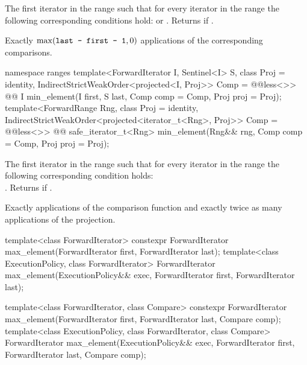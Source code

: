 \begin{itemdescr}
\pnum
\returns
The first iterator
in the range
such that for every iterator
in the range
the following corresponding conditions hold:
or
.
Returns
if
.

\pnum
\complexity
Exactly
$\max(\texttt{last - first - 1}, 0)$
applications of the corresponding comparisons.
\end{itemdescr}

\begin{addedblock}
%
\begin{itemdecl}
namespace ranges {
  template<ForwardIterator I, Sentinel<I> S, class Proj = identity,
      IndirectStrictWeakOrder<projected<I, Proj>> Comp = @@less<>>
    @@ I min_element(I first, S last, Comp comp = Comp{}, Proj proj = Proj{});
  template<ForwardRange Rng, class Proj = identity,
      IndirectStrictWeakOrder<projected<iterator_t<Rng>, Proj>> Comp = @@less<>>
    @@ safe_iterator_t<Rng>
      min_element(Rng&& rng, Comp comp = Comp{}, Proj proj = Proj{});
}
\end{itemdecl}

\begin{itemdescr}
\pnum
\returns
The first iterator
in the range
such that for every iterator
in the range
the following corresponding condition holds: \\
.
Returns
if
.

\pnum
\complexity
Exactly
applications of the comparison function and
exactly twice as many applications of the projection.
\end{itemdescr}
\end{addedblock}

%
\begin{itemdecl}
template<class ForwardIterator>
  constexpr ForwardIterator max_element(ForwardIterator first, ForwardIterator last);
template<class ExecutionPolicy, class ForwardIterator>
  ForwardIterator max_element(ExecutionPolicy&& exec,
                              ForwardIterator first, ForwardIterator last);

template<class ForwardIterator, class Compare>
  constexpr ForwardIterator max_element(ForwardIterator first, ForwardIterator last,
                                        Compare comp);
template<class ExecutionPolicy, class ForwardIterator, class Compare>
  ForwardIterator max_element(ExecutionPolicy&& exec,
                              ForwardIterator first, ForwardIterator last,
                              Compare comp);
\end{itemdecl}

